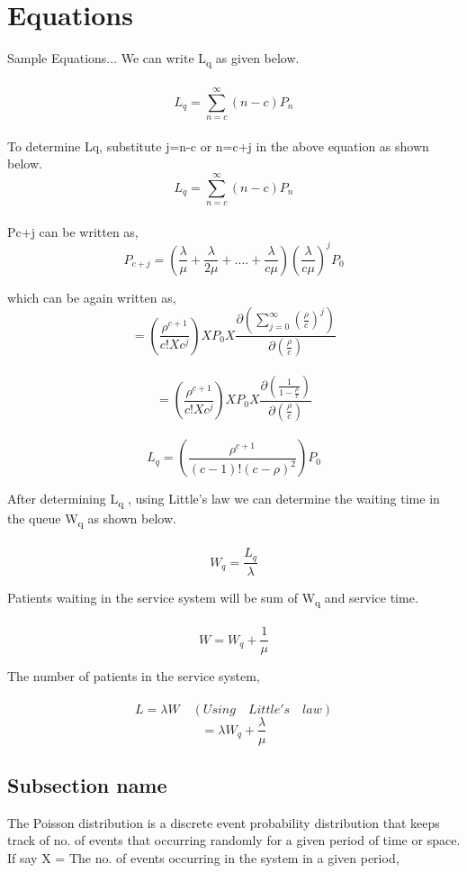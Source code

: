 \documentclass[12pt,a4paper]{report}
\begin{document}
\section{Equations}
Sample Equations...
 We can write L\textsubscript q as given below.\\\\
\[L_q= \sum_{n=c}^{ \infty } (n-c)P_n \]
\\
To determine Lq, substitute j=n-c or n=c+j in the above equation as shown below.
\[L_q= \sum_{n=c}^{ \infty } (n-c)P_n \]\\
	Pc+j can be written as,
\[P_{c+j}= \left(\frac{ \lambda }{ \mu }+\frac{ \lambda  }{2\mu}+....+\frac{ \lambda  }{c \mu} \right)\left (\frac{ \lambda  }{c\mu} \right) ^{j} P_0 \]

\pagebreak
which can be again written as,\\
\[ =\left ({\frac{\rho ^{c+1}}{c!Xc^{j}}}  \right )
X P_0 X \frac{\partial \left(\sum_{j=0}^\infty\left ( \frac{\rho }{c} \right )^{j} \right)}{\partial \left ( \frac{\rho }{c} \right )}\]\\
\[ = \left ({\frac{\rho ^{c+1}}{c! X c^{j}}}  \right )
X P_0 X \frac{\partial \left ( \frac{1}{1 - \frac{\rho }{c}} \right )}{\partial \left ( \frac{\rho }{c} \right )}\]\\
\[L_q = \left ( \frac{\rho ^{c+1}}{(c-1)!(c-\rho )^{2}} \right )P_0 \]

After determining L\textsubscript q , using Little’s law we can determine the waiting time in the queue W\textsubscript q as shown below.\\\\
\[W_q= \frac {L_q}{ \lambda } \]

Patients waiting in the service system will be sum of W\textsubscript q and service time.\\\\
\[ W=W_q+ \frac{1}{\mu} \]

The number of patients in the service system,\\\\
\[ L=\lambda W  \quad (Using \quad Little's \quad law) \]
\[ = \lambda W_q+\frac{\lambda}{\mu}\]

\pagebreak
\subsection{Subsection name}
The Poisson distribution \cite{feng2016steady} is a discrete event probability distribution that keeps track of no. of events that occurring randomly for a given period of time or space.\\
If say X = The no. of events occurring in the system in a given period,\\
\end{document}
